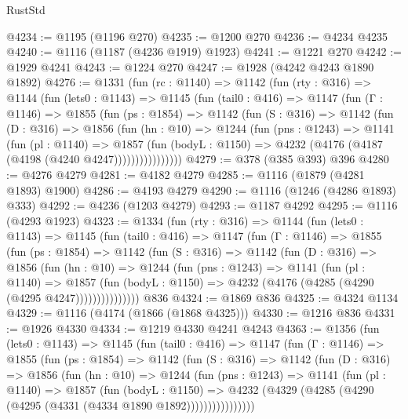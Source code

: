 \begin{lexlean}{RustStd}
\begin{coremodule}
{\begin{coremodule}
{{{{{{{{{{{@4234 := @1195 (@1196 @270)
@4235 := @1200 @270
@4236 := @4234 @4235
@4240 := @1116 (@1187 (@4236 @1919) @1923)
@4241 := @1221 @270
@4242 := @1929 @4241
@4243 := @1224 @270
@4247 := @1928 (@4242 @4243 @1890 @1892)
@4276 := @1331
    (fun (rc : @1140) =>
    @1142
      (fun (rty : @316) =>
      @1144
        (fun (lets0 : @1143) =>
        @1145
          (fun (tail0 : @416) =>
          @1147
            (fun (Γ : @1146) =>
            @1855
              (fun (ps : @1854) =>
              @1142
                (fun (S : @316) =>
                @1142
                  (fun (D : @316) =>
                  @1856
                    (fun (hn : @10) =>
                    @1244
                      (fun (pns : @1243) =>
                      @1141
                        (fun (pl : @1140) =>
                        @1857
                          (fun (bodyL : @1150) =>
                          @4232 (@4176 (@4187 (@4198 (@4240 @4247))))))))))))))))
@4279 := @378 (@385 @393) @396
@4280 := @4276 @4279
@4281 := @4182 @4279
@4285 := @1116 (@1879 (@4281 @1893) @1900)
@4286 := @4193 @4279
@4290 := @1116 (@1246 (@4286 @1893) @333)
@4292 := @4236 (@1203 @4279)
@4293 := @1187 @4292
@4295 := @1116 (@4293 @1923)
@4323 := @1334
    (fun (rty : @316) =>
    @1144
      (fun (lets0 : @1143) =>
      @1145
        (fun (tail0 : @416) =>
        @1147
          (fun (Γ : @1146) =>
          @1855
            (fun (ps : @1854) =>
            @1142
              (fun (S : @316) =>
              @1142
                (fun (D : @316) =>
                @1856
                  (fun (hn : @10) =>
                  @1244
                    (fun (pns : @1243) =>
                    @1141
                      (fun (pl : @1140) =>
                      @1857
                        (fun (bodyL : @1150) =>
                        @4232 (@4176 (@4285 (@4290 (@4295 @4247)))))))))))))))
    @836
@4324 := @1869 @836
@4325 := @4324 @1134
@4329 := @1116 (@4174 (@1866 (@1868 @4325)))
@4330 := @1216 @836
@4331 := @1926 @4330
@4334 := @1219 @4330 @4241 @4243
@4363 := @1356
    (fun (lets0 : @1143) =>
    @1145
      (fun (tail0 : @416) =>
      @1147
        (fun (Γ : @1146) =>
        @1855
          (fun (ps : @1854) =>
          @1142
            (fun (S : @316) =>
            @1142
              (fun (D : @316) =>
              @1856
                (fun (hn : @10) =>
                @1244
                  (fun (pns : @1243) =>
                  @1141
                    (fun (pl : @1140) =>
                    @1857
                      (fun (bodyL : @1150) =>
                      @4232 (@4329 (@4285 (@4290 (@4295 (@4331 (@4334 @1890 @1892))))))))))))))))
}}}}}}}}}}}
\end{coremodule}}
\end{coremodule}
\end{lexlean}
